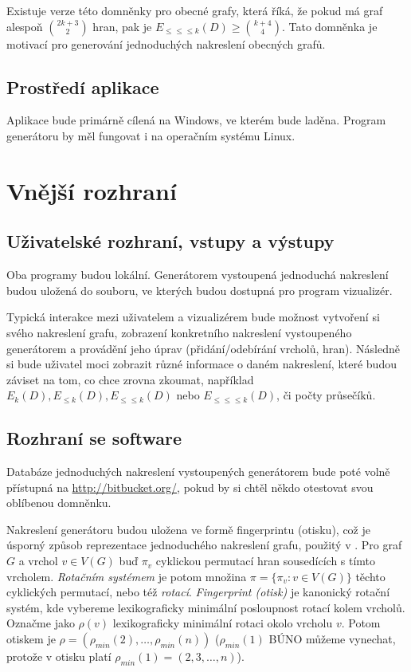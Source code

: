 \documentclass{article}
\begin{document}

Existuje verze této domněnky pro obecné grafy, která říká, že pokud má graf alespoň ${2k+3 \choose 2}$ hran, pak je $E_{\leq\leq\leq k}(D) \geq {k+4 \choose 4}$.
Tato domněnka je motivací pro generování jednoduchých nakreslení obecných grafů. 

\subsection{Prostředí aplikace}

Aplikace bude primárně cílená na Windows, ve kterém bude laděna. Program generátoru by měl fungovat i na operačním systému Linux.  

\section{Vnější rozhraní}

\subsection{Uživatelské rozhraní, vstupy a výstupy}

Oba programy budou lokální. 
Generátorem vystoupená jednoduchá nakreslení budou uložená do souboru, ve kterých budou dostupná pro program vizualizér.  

Typická interakce mezi uživatelem a vizualizérem bude možnost vytvoření si svého nakreslení grafu, zobrazení konkretního nakreslení vystoupeného generátorem a provádění jeho úprav (přidání/odebírání vrcholů, hran). Následně si bude uživatel moci zobrazit různé informace o daném nakreslení, které budou záviset na tom, co chce zrovna zkoumat, například $E_k(D), E_{\leq k}(D), E_{\leq\leq k}(D)$ nebo $E_{\leq\leq\leq k}(D)$, či počty průsečíků. 

\subsection{Rozhraní se software}

Databáze jednoduchých nakreslení vystoupených generátorem bude poté volně přístupná na \url{http://bitbucket.org/}, pokud by si chtěl někdo otestovat svou oblíbenou domněnku.

Nakreslení generátoru budou uložena ve formě fingerprintu (otisku), což je úsporný způsob reprezentace jednoduchého nakreslení grafu, použitý v \cite{mastersthesis}.
Pro graf $G$ a vrchol $v \in V(G)$ buď $\pi_v$ cyklickou permutací hran sousedících s tímto vrcholem. {\it Rotačním systémem} je potom množina $\pi = \{\pi_v : v \in V(G)\}$ těchto cyklických permutací, nebo též {\it rotací}.
{\it Fingerprint (otisk)} je kanonický rotační systém, kde vybereme lexikograficky minimální posloupnost rotací kolem vrcholů. Označme jako $\rho(v)$ lexikograficky minimální rotaci okolo vrcholu $v$. Potom otiskem je $\rho = (\rho_{min}(2), \dots, \rho_{min}(n))$ ($\rho_{min}(1)$ BÚNO můžeme vynechat, protože v otisku platí $\rho_{min}(1) = (2, 3, \ldots, n)$). 
\end{document}

